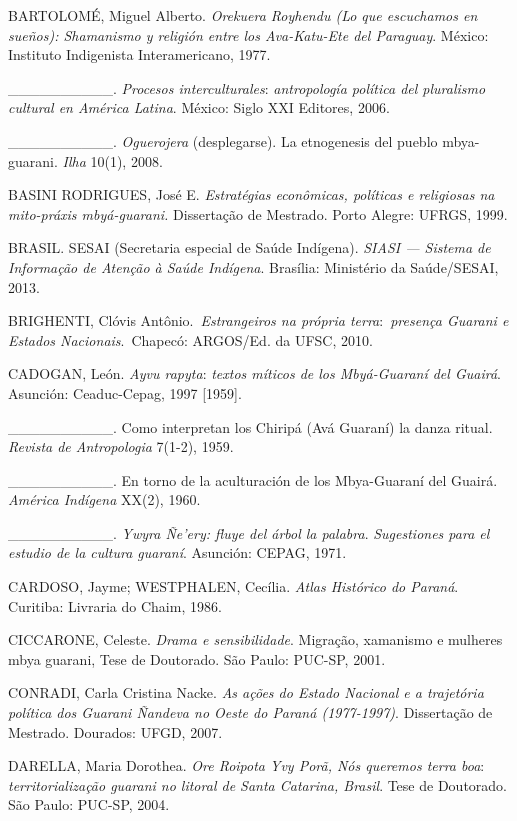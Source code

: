 BARTOLOMÉ, Miguel Alberto. \emph{Orekuera Royhendu (Lo que escuchamos en
sueños): Shamanismo y religión entre los Ava-Katu-Ete del Paraguay}.
México: Instituto Indigenista Interamericano, 1977.

\_\_\_\_\_\_\_\_\_\_. \emph{Procesos interculturales}:
\emph{antropología política del pluralismo cultural en América Latina}.
México: Siglo XXI Editores, 2006.

\_\_\_\_\_\_\_\_\_\_. \emph{Oguerojera} (desplegarse). La etnogenesis
del pueblo mbya-guarani. \emph{Ilha} 10(1), 2008.

BASINI RODRIGUES, José E. \emph{Estratégias econômicas, políticas e
religiosas na mito-práxis mbyá-guarani.} Dissertação de Mestrado. Porto
Alegre: UFRGS, 1999.

BRASIL. SESAI (Secretaria especial de Saúde Indígena). \emph{SIASI ---
Sistema de Informação de Atenção à Saúde Indígena}. Brasília: Ministério
da Saúde/SESAI, 2013.

BRIGHENTI, Clóvis Antônio.~\emph{Estrangeiros na própria
terra}:~\emph{presença Guarani e Estados Nacionais}.~Chapecó: ARGOS/Ed.
da UFSC, 2010.

CADOGAN, León. \emph{Ayvu rapyta}: \emph{textos míticos de los
Mbyá-Guaraní del Guairá}. Asunción: Ceaduc-Cepag, 1997 {[}1959{]}.

\_\_\_\_\_\_\_\_\_\_. Como interpretan los Chiripá (Avá Guaraní) la
danza ritual. \emph{Revista de Antropologia} 7(1-2), 1959.

\_\_\_\_\_\_\_\_\_\_. En torno de la aculturación de los Mbya-Guaraní
del Guairá. \emph{América Indígena} XX(2), 1960.

\_\_\_\_\_\_\_\_\_\_. \emph{Ywyra Ñe'ery: fluye del árbol la palabra}.
\emph{Sugestiones para el estudio de la cultura guaraní}. Asunción:
CEPAG, 1971.

CARDOSO, Jayme; WESTPHALEN, Cecília. \emph{Atlas Histórico do Paraná}.
Curitiba: Livraria do Chaim, 1986.

CICCARONE, Celeste. \emph{Drama e sensibilidade}. Migração, xamanismo e
mulheres mbya guarani, Tese de Doutorado. São Paulo: PUC-SP, 2001.

CONRADI, Carla Cristina Nacke. \emph{As ações do Estado Nacional e a
trajetória política dos Guarani Ñandeva no Oeste do Paraná (1977-1997)}.
Dissertação de Mestrado. Dourados: UFGD, 2007.

DARELLA, Maria Dorothea. \emph{Ore Roipota Yvy Porã, Nós queremos terra
boa}: \emph{territorialização guarani no litoral de Santa Catarina,
Brasil}. Tese de Doutorado. São Paulo: PUC-SP, 2004.

